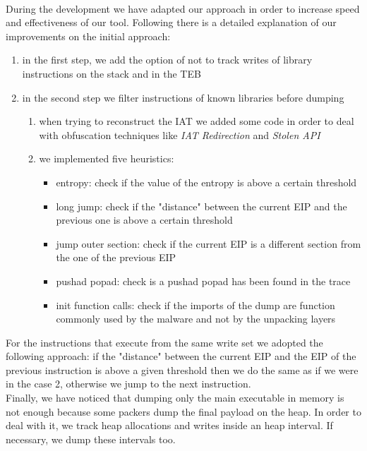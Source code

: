 \paragraph{}
During the development we have adapted our approach in order to increase speed and effectiveness of our tool. Following there is a detailed explanation of our improvements on the initial approach:
\begin{enumerate}
\item in the first step, we add the option of not to track writes of library instructions on the stack and in the TEB
\item in the second step we filter instructions of known libraries before dumping
	\begin{enumerate}
	\item when trying to reconstruct the IAT we added some code in order to deal with 			obfuscation techniques like \textit{IAT Redirection} and \textit{Stolen API}
	\item we implemented five heuristics:
		\begin{itemize}
		\item entropy: check if the value of the entropy is above a certain threshold
		\item long jump: check if the "distance" between the current EIP and the previous 			one is above a certain threshold
		\item jump outer section: check if the current EIP is a different section from the 		one of the previous EIP
		\item pushad popad: check is a pushad popad has been found in the trace
		\item init function calls: check if the imports of the dump are function commonly 			 used by the malware and not by the unpacking layers
		\end{itemize}
	\end{enumerate}
\end{enumerate} 
For the instructions that execute from the same write set we adopted the following approach: if the "distance" between the current EIP and the EIP of the previous instruction is above a given threshold then we do the same as if we were in the case 2, otherwise we jump to the next instruction.\\
Finally, we have noticed that dumping only the main executable in memory is not enough because some packers dump the final payload on the heap. In order to deal with it, we track heap allocations and writes inside an heap interval. If necessary, we dump these intervals too.

